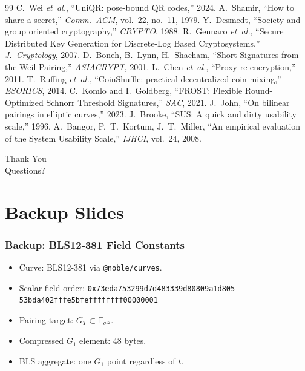 \documentclass{beamer}
\begin{document}
\begin{frame}[allowframebreaks]
\begin{thebibliography}{99}
     C.~Wei \emph{et~al.}, ``UniQR: pose-bound QR codes,'' 2024.
     A.~Shamir, ``How to share a secret,'' \emph{Comm.~ACM}, vol.~22, no.~11, 1979.
     Y.~Desmedt, ``Society and group oriented cryptography,'' \emph{CRYPTO}, 1988.
     R.~Gennaro \emph{et~al.}, ``Secure Distributed Key Generation for Discrete-Log Based Cryptosystems,'' \emph{J.~Cryptology}, 2007.
     D.~Boneh, B.~Lynn, H.~Shacham, ``Short Signatures from the Weil Pairing,'' \emph{ASIACRYPT}, 2001.
     L.~Chen \emph{et~al.}, ``Proxy re-encryption,'' 2011.
     T.~Ruffing \emph{et~al.}, ``CoinShuffle: practical decentralized coin mixing,'' \emph{ESORICS}, 2014.
     C.~Komlo and I.~Goldberg, ``FROST: Flexible Round-Optimized Schnorr Threshold Signatures,'' \emph{SAC}, 2021.
     J.~John, ``On bilinear pairings in elliptic curves,'' 2023.
     J.~Brooke, ``SUS: A quick and dirty usability scale,'' 1996.
     A.~Bangor, P.~T.~Kortum, J.~T.~Miller, ``An empirical evaluation of the System Usability Scale,'' \emph{IJHCI}, vol.~24, 2008.
  \end{thebibliography}
\end{frame}

\begin{frame}
  \begin{center}
    \Huge Thank You \\
    \vspace{0.5cm}
    \Large Questions?
  \end{center}
\end{frame}

\appendix
\section*{Backup Slides}

\begin{frame}
  \frametitle{Backup: BLS12-381 Field Constants}
  \begin{itemize}
    \item Curve: BLS12-381 via \texttt{@noble/curves}.
    \item Scalar field order:
      {\small \texttt{0x73eda753299d7d483339d80809a1d805} \\
              \texttt{53bda402fffe5bfeffffffff00000001}}
    \item Pairing target: $G_T \subset \mathbb{F}_{q^{12}}$.
    \item Compressed $G_1$ element: 48 bytes.
    \item BLS aggregate: one $G_1$ point regardless of $t$.
  \end{itemize}
\end{frame}
\end{document}
